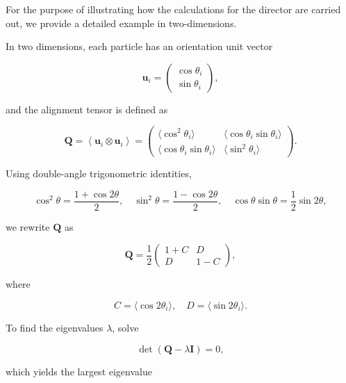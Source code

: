 \documentclass[
  letterpaper,
  enabledeprecatedfontcommands]{report}
\begin{document}
\begin{tcolorbox}[enhanced jigsaw, toprule=.15mm, opacityback=0, colbacktitle=quarto-callout-note-color!10!white, title=\textcolor{quarto-callout-note-color}{\faInfo}\hspace{0.5em}{Derivation of 2D director}, leftrule=.75mm, rightrule=.15mm, bottomtitle=1mm, breakable, colframe=quarto-callout-note-color-frame, colback=white, toptitle=1mm, left=2mm, titlerule=0mm, coltitle=black, arc=.35mm, bottomrule=.15mm, opacitybacktitle=0.6]

For the purpose of illustrating how the calculations for the director
are carried out, we provide a detailed example in two-dimensions.

In two dimensions, each particle has an orientation unit vector

\[
\mathbf{u}_i = \begin{pmatrix} \cos \theta_i \\ \sin \theta_i \end{pmatrix},
\]

and the alignment tensor is defined as

\[
\mathbf{Q} = \left\langle \mathbf{u}_i \otimes \mathbf{u}_i \right\rangle = \begin{pmatrix}
\langle \cos^2 \theta_i \rangle & \langle \cos \theta_i \sin \theta_i \rangle \\
\langle \cos \theta_i \sin \theta_i \rangle & \langle \sin^2 \theta_i \rangle
\end{pmatrix}.
\]

Using double-angle trigonometric identities,

\[
\cos^2 \theta = \frac{1 + \cos 2\theta}{2}, \quad \sin^2 \theta = \frac{1 - \cos 2\theta}{2}, \quad \cos \theta \sin \theta = \frac{1}{2} \sin 2\theta,
\]

we rewrite \(\mathbf{Q}\) as

\[
\mathbf{Q} = \frac{1}{2} \begin{pmatrix}
1 + C & D \\
D & 1 - C
\end{pmatrix},
\]

where

\[
C = \langle \cos 2\theta_i \rangle, \quad D = \langle \sin 2\theta_i \rangle.
\]

To find the eigenvalues \(\lambda\), solve

\[
\det(\mathbf{Q} - \lambda \mathbf{I}) = 0,
\]

which yields the largest eigenvalue


\end{tcolorbox}
\end{document}
